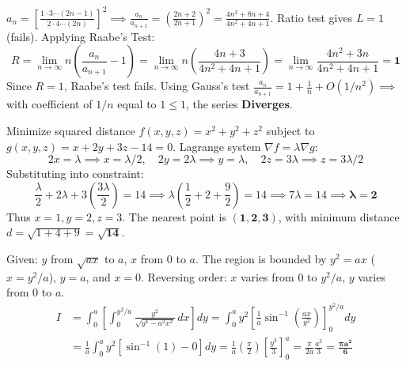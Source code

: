 \begin{solutionbox}
$a_n = \left[\frac{1 \cdot 3 \cdots (2n-1)}{2 \cdot 4 \cdots (2n)}\right]^2 \implies \frac{a_n}{a_{n+1}} = \left(\frac{2n+2}{2n+1}\right)^2 = \frac{4n^2 + 8n + 4}{4n^2 + 4n + 1}$.
Ratio test gives $L = 1$ (fails).
Applying Raabe's Test:
\begin{equation*}
    R = \lim_{n\to\infty} n\left(\frac{a_n}{a_{n+1}}-1\right) = \lim_{n\to\infty} n\left(\frac{4n+3}{4n^2+4n+1}\right) = \lim_{n\to\infty}\frac{4n^2+3n}{4n^2+4n+1} = \mathbf{1}
\end{equation*}
Since $R = 1$, Raabe's test fails. Using Gauss's test $\frac{a_n}{a_{n+1}} = 1 + \frac{1}{n} + O(1/n^2) \implies$ with coefficient of $1/n$ equal to $1 \le 1$, the series \textbf{Diverges}.
\end{solutionbox}

\begin{solutionbox}
Minimize squared distance $f(x,y,z) = x^2 + y^2 + z^2$ subject to $g(x,y,z) = x + 2y + 3z - 14 = 0$.
Lagrange system $\nabla f = \lambda \nabla g$:
\begin{equation*}
    2x = \lambda \implies x = \lambda/2, \quad 2y = 2\lambda \implies y = \lambda, \quad 2z = 3\lambda \implies z = 3\lambda/2
\end{equation*}
Substituting into constraint:
\begin{equation*}
    \frac{\lambda}{2} + 2\lambda + 3\left(\frac{3\lambda}{2}\right) = 14 \implies \lambda\left(\frac{1}{2} + 2 + \frac{9}{2}\right) = 14 \implies 7\lambda = 14 \implies \mathbf{\lambda = 2}
\end{equation*}
Thus $x = 1, y = 2, z = 3$. The nearest point is $\mathbf{(1, 2, 3)}$, with minimum distance $d = \sqrt{1+4+9} = \mathbf{\sqrt{14}}$.
\end{solutionbox}

\begin{solutionbox}
Given: $y$ from $\sqrt{ax}$ to $a$, $x$ from $0$ to $a$. The region is bounded by $y^2 = ax$ ($x = y^2/a$), $y = a$, and $x = 0$.
Reversing order: $x$ varies from $0$ to $y^2/a$, $y$ varies from $0$ to $a$.
\begin{align*}
    I &= \int_0^a \left[ \int_0^{y^2/a} \frac{y^2}{\sqrt{y^4 - a^2 x^2}}\,dx \right] dy = \int_0^a y^2 \left[ \frac{1}{a}\sin^{-1}\left(\frac{ax}{y^2}\right) \right]_0^{y^2/a} dy \\
    &= \frac{1}{a}\int_0^a y^2 \left[\sin^{-1}(1) - 0\right] dy = \frac{1}{a}\left(\frac{\pi}{2}\right) \left[ \frac{y^3}{3} \right]_0^a = \frac{\pi}{2a} \frac{a^3}{3} = \mathbf{\frac{\pi a^2}{6}}
\end{align*}
\end{solutionbox}
